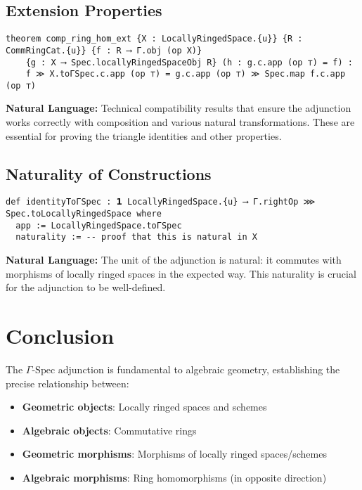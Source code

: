 \documentclass{article}
\theoremstyle{definition}
\begin{document}
\subsection{Extension Properties}

\begin{lstlisting}
theorem comp_ring_hom_ext {X : LocallyRingedSpace.{u}} {R : CommRingCat.{u}} {f : R ⟶ Γ.obj (op X)}
    {g : X ⟶ Spec.locallyRingedSpaceObj R} (h : g.c.app (op ⊤) = f) :
    f ≫ X.toΓSpec.c.app (op ⊤) = g.c.app (op ⊤) ≫ Spec.map f.c.app (op ⊤)
\end{lstlisting}

\textbf{Natural Language:} Technical compatibility results that ensure the adjunction works correctly with composition and various natural transformations. These are essential for proving the triangle identities and other properties.

\subsection{Naturality of Constructions}

\begin{lstlisting}
def identityToΓSpec : 𝟭 LocallyRingedSpace.{u} ⟶ Γ.rightOp ⋙ Spec.toLocallyRingedSpace where
  app := LocallyRingedSpace.toΓSpec
  naturality := -- proof that this is natural in X
\end{lstlisting}

\textbf{Natural Language:} The unit of the adjunction is natural: it commutes with morphisms of locally ringed spaces in the expected way. This naturality is crucial for the adjunction to be well-defined.

\section{Conclusion}

The $\Gamma$-$\mathrm{Spec}$ adjunction is fundamental to algebraic geometry, establishing the precise relationship between:

\begin{itemize}
\item \textbf{Geometric objects}: Locally ringed spaces and schemes  
\item \textbf{Algebraic objects}: Commutative rings
\item \textbf{Geometric morphisms}: Morphisms of locally ringed spaces/schemes
\item \textbf{Algebraic morphisms}: Ring homomorphisms (in opposite direction)
\end{itemize}
\end{document}
